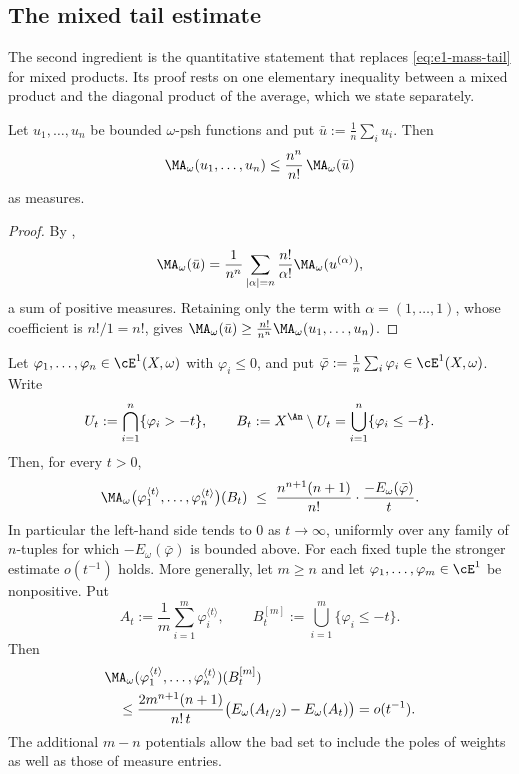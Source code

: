 \subsection{The mixed tail estimate}
\label{sec:ch26-mixed-tail}

The second ingredient is the quantitative statement that replaces
\eqref{eq:e1-mass-tail} for mixed products.  Its proof rests on one
elementary inequality between a mixed product and the diagonal product of the
average, which we state separately.

\begin{lemma}
\label{lem:ch26-average-domination}
Let $u_1,\ldots,u_n$ be bounded $\omega$-psh functions and put
$\bar u:=\frac1n\sum_iu_i$.  Then
\begin{equation}
\label{eq:ch26-average-domination}
 \MA_\omega(u_1,\ldots,u_n)
 \leq\frac{n^n}{n!}\,\MA_\omega(\bar u)
\end{equation}
as measures.
\end{lemma}

\begin{proof}
By ,
\[
 \MA_\omega(\bar u)
 =\frac1{n^n}\sum_{|\alpha|=n}\frac{n!}{\alpha!}
   \MA_\omega(u^{(\alpha)}),
\]
a sum of positive measures.  Retaining only the term with
$\alpha=(1,\ldots,1)$, whose coefficient is $n!/1=n!$, gives
$\MA_\omega(\bar u)\geq\frac{n!}{n^n}\MA_\omega(u_1,\ldots,u_n)$.
\end{proof}

\begin{lemma}
\label{lem:ch26-mixed-tail}
Let $\varphi_1,\ldots,\varphi_n\in\cE^1(X,\omega)$ with
$\varphi_i\leq0$, and put
$\bar\varphi:=\frac1n\sum_i\varphi_i\in\cE^1(X,\omega)$.  Write
\[
 U_t:=\bigcap_{i=1}^n\{\varphi_i>-t\},
 \qquad
 B_t:=X^{\An}\setminus U_t=\bigcup_{i=1}^n\{\varphi_i\leq-t\}.
\]
Then, for every $t>0$,
\begin{equation}
\label{eq:ch26-mixed-tail}
 \MA_\omega\bigl(\varphi_1^{\langle t\rangle},\ldots,
   \varphi_n^{\langle t\rangle}\bigr)(B_t)
 \ \leq\ \frac{n^{n+1}(n+1)}{n!}\cdot
   \frac{-E_\omega(\bar\varphi)}{t}.
\end{equation}
In particular the left-hand side tends to $0$ as $t\to\infty$, uniformly
over any family of $n$-tuples for which $-E_\omega(\bar\varphi)$ is
bounded above.  For each fixed tuple the stronger estimate $o(t^{-1})$
holds.  More generally, let $m\geq n$ and let
$\varphi_1,\ldots,\varphi_m\in\cE^1$ be nonpositive.  Put
\[
 A_t:=\frac1m\sum_{i=1}^m\varphi_i^{\langle t\rangle},
 \qquad B_t^{[m]}:=\bigcup_{i=1}^m\{\varphi_i\leq-t\}.
\]
Then
\[
\begin{aligned}
 &\MA_\omega(\varphi_1^{\langle t\rangle},\ldots,
              \varphi_n^{\langle t\rangle})(B_t^{[m]})\\
 &\quad\leq\frac{2m^{n+1}(n+1)}{n!\,t}
       \bigl(E_\omega(A_{t/2})-E_\omega(A_t)\bigr)
       =o(t^{-1}).
\end{aligned}
\]
The additional $m-n$ potentials allow the bad set to include the poles of
weights as well as those of measure entries.
\end{lemma}

